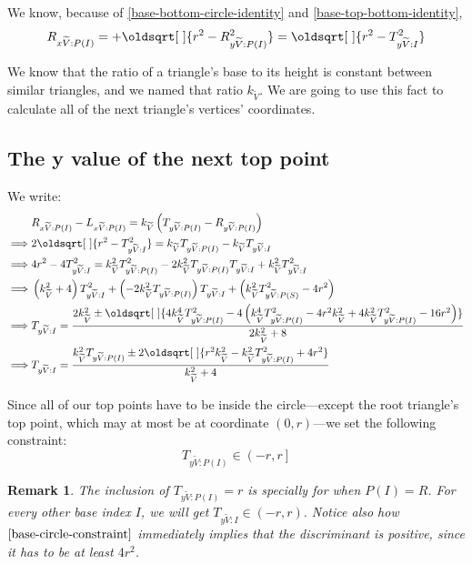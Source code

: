 \documentclass[a4paper,12pt]{article}
\newcommand{\HSview}[1][V]{\widetilde{#1}}
\newcommand{\HSLx}[1][I]{L_{x\HSview:#1}}
\newcommand{\HSRx}[1][I]{R_{x\HSview:#1}}
\newcommand{\HSTy}[1][I]{T_{y\HSview:#1}}
\newcommand{\HSRy}[1][I]{R_{y\HSview:#1}}
\newcommand{\HSk}{k_{\HSview}}
\renewcommand*{\sqrt}[2][\ ]{\oldsqrt[#1]{#2} }
\newtheorem*{remark}{Remark}
\theoremstyle{definition}
\theoremstyle{plain}
\begin{document}
	We know, because of \eqref{base-bottom-circle-identity} and \eqref{base-top-bottom-identity},
	$$\HSRx[P(I)] = +\sqrt{r^2 - \HSRy[P(I)]^2} = \sqrt{r^2 - \HSTy^2}$$
	
	We know that the ratio of a triangle's base to its height is constant between similar triangles, and we named that ratio $\HSk$.
	We are going to use this fact to calculate all of the next triangle's vertices' coordinates.

	\subsection{The y value of the next top point}

	We write:
	\begin{align*}
	  & \HSRx[P(I)] - \HSLx[P(I)] = \HSk\left(\HSTy[P(I)] - \HSRy[P(I)]\right)\\
		\implies & 2\sqrt{r^2 - \HSTy^2} = \HSk\HSTy[P(I)] - \HSk\HSTy\\
		\implies & 4r^2 - 4\HSTy^2 = \HSk^2\HSTy[P(I)]^2 - 2\HSk^2\HSTy[P(I)]\HSTy + \HSk^2\HSTy^2\\
		\implies & \left(k^2_{\HSview} + 4\right)\HSTy^2 + \left(-2k^2_{\HSview}\HSTy[P(I)]\right)\HSTy + \left(k^2_{\HSview}\HSTy[P(S)]^2 - 4r^2\right)\\
		\implies & \HSTy = \frac{
			2k^2_{\HSview} \pm \sqrt{
				4k^4_{\HSview}\HSTy[P(I)]^2 -
				4\left(
					k^4_{\HSview}\HSTy[P(I)]^2 -
					4r^2k^2_{\HSview} +
					4k^2_{\HSview}\HSTy[P(I)]^2 -
					16r^2
				\right)
			}
		}{2k^2_{\HSview} + 8}\\
		\implies & \HSTy = \frac{
			k^2_{\HSview}\HSTy[P(I)] \pm 2\sqrt{
				r^2k^2_{\HSview} -
				k^2_{\HSview}\HSTy[P(I)]^2 +
				4r^2
			}
		}{k^2_{\HSview} + 4}
	\end{align*}
	
	Since all of our top points have to be inside the circle---except the root triangle's top point, which may at most be at coordinate $(0, r)$---we set the following constraint:
	\begin{equation}
		\HSTy[P(I)] \in \left(-r, r\right]\label{base-circle-constraint}
	\end{equation}

	\begin{remark}
		The inclusion of $\HSTy[P(I)] = r$ is specially for when $P(I) = R$. For every other base index $I$, we will get $\HSTy \in \left(-r, r\right).$
		Notice also how $\eqref{base-circle-constraint}$ immediately implies that the discriminant is positive, since it has to be at least $4r^2$.
	\end{remark}
\end{document}
